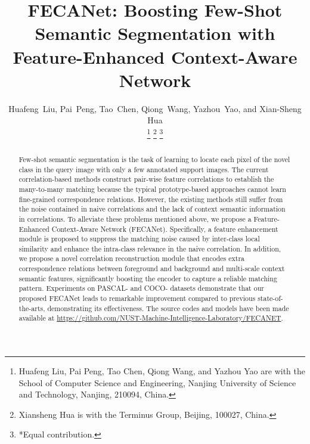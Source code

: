 \documentclass[journal]{IEEEtran}
\begin{document}
\title{FECANet: Boosting Few-Shot Semantic Segmentation with Feature-Enhanced Context-Aware Network}

\author{
	Huafeng~Liu,
	Pai~Peng,
	Tao~Chen,
	Qiong~Wang,
	Yazhou~Yao,
	and Xian-Sheng Hua

	
	
	\thanks{Huafeng Liu, Pai Peng, Tao Chen, Qiong Wang, and Yazhou Yao are with the School of Computer Science and Engineering, Nanjing University of Science and Technology, Nanjing, 210094, China.}
	\thanks{Xiansheng Hua is with the Terminus Group, Beijing, 100027, China.}	
	\thanks{*Equal contribution.}
}





\maketitle


\begin{abstract}
Few-shot semantic segmentation is the task of learning to locate each pixel of the novel class in the query image with only a few annotated support images. The current correlation-based methods construct pair-wise feature correlations to establish the many-to-many matching because the typical prototype-based approaches cannot learn fine-grained correspondence relations. However, the existing methods still suffer from the noise contained in naive correlations and the lack of context semantic information in correlations. To alleviate these problems mentioned above, we propose a Feature-Enhanced Context-Aware Network (FECANet). Specifically, a feature enhancement module is proposed to suppress the matching noise caused by inter-class local similarity and enhance the intra-class relevance in the naive correlation. In addition, we propose a novel correlation reconstruction module that encodes extra correspondence relations between foreground and background and multi-scale context semantic features, significantly boosting the encoder to capture a reliable matching pattern. Experiments on PASCAL- and COCO- datasets demonstrate that our proposed FECANet leads to remarkable improvement compared to previous state-of-the-arts, demonstrating its effectiveness. The source codes and models have been made available at \url{https://github.com/NUST-Machine-Intelligence-Laboratory/FECANET}.

\end{abstract}
\end{document}
